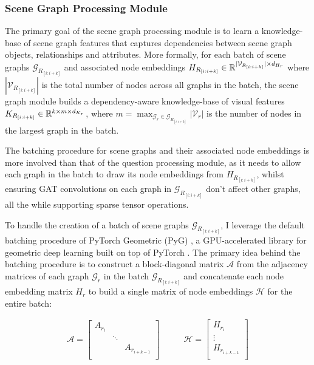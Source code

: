 \subsubsection{Scene Graph Processing Module}

The primary goal of the scene graph processing module is to learn a knowledge-base of scene graph features that captures dependencies between scene graph objects, relationships and attributes. More formally, for each batch of scene graphs \(\mathcal{G}_{R_{[i:i+k]}}\) and associated node embeddings \(H_{R_{[i:i+k]}} \in \mathbb{R}^{|\mathcal{V}_{R_{[i:i+k]}}| \times d_{H_r}}\) where \(|\mathcal{V}_{R_{[i:i+k]}}|\) is the total number of nodes across all graphs in the batch, the scene graph module builds a dependency-aware knowledge-base of visual features \(K_{R_{[i:i+k]}} \in \mathbb{R}^{k \times m \times d_{K_r}}\), where \(m = \max_{\mathcal{G}_r \in \mathcal{G}_{R_{[i:i+k]}}} |\mathcal{V}_r|\) is the number of nodes in the largest graph in the batch.

The batching procedure for scene graphs and their associated node embeddings is more involved than that of the question processing module, as it needs to allow each graph in the batch to draw its node embeddings from \(H_{R_{[i:i+k]}}\), whilst ensuring GAT convolutions on each graph in \(\mathcal{G}_{R_{[i:i+k]}}\) don't affect other graphs, all the while supporting sparse tensor operations.

To handle the creation of a batch of scene graphs \(\mathcal{G}_{R_{[i:i+k]}}\), I leverage the default batching procedure of PyTorch Geometric (PyG) \cite{fey2019fast}, a GPU-accelerated library for geometric deep learning built on top of PyTorch \cite{paszke2019pytorch}. The primary idea behind the batching procedure is to construct a block-diagonal matrix \(\mathcal{A}\) from the adjacency matrices of each graph \(\mathcal{G}_r\) in the batch \(\mathcal{G}_{R_{[i:i+k]}}\) and concatenate each node embedding matrix \(H_r\) to build a single matrix of node embeddings \(\mathcal{H}\) for the entire batch:

\begin{align*}
    \mathcal{A} = \begin{bmatrix}A_{r_i} & & \\ & \ddots & \\ & & A_{r_{i+k-1}}\\\end{bmatrix} & \qquad
    \mathcal{H} = \begin{bmatrix}H_{r_i}\\ \vdots \\ H_{r_{i+k-1}}\\\end{bmatrix}\\
\end{align*}

